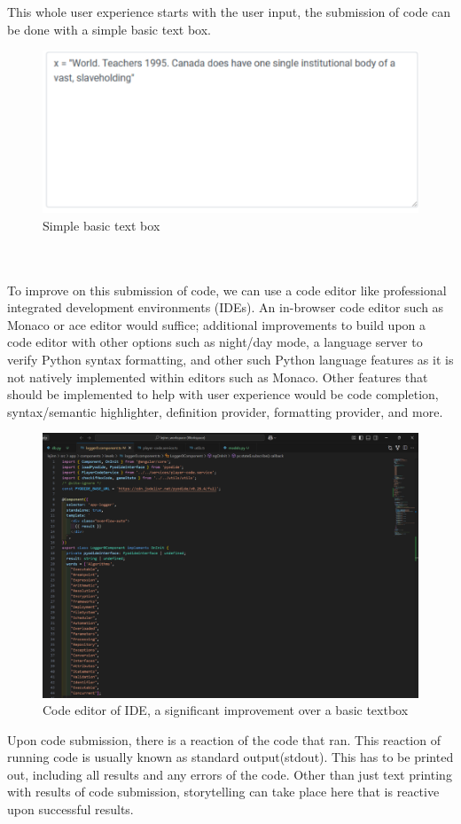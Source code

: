 This whole user experience starts with the user input, the submission of code can be done with a simple basic text box.
\begin{figure}[h]
    \centering
    \includegraphics[width=0.5\linewidth]{images/textbox.png}
    \caption{Simple basic text box}
\end{figure}
\\\\
To improve on this submission of code, we can use a code editor like professional integrated development environments (IDEs). An in-browser code editor such as Monaco or ace editor would suffice; additional improvements to build upon a code editor with other options such as night/day mode, a language server to verify Python syntax formatting, and other such Python language features as it is not natively implemented within editors such as Monaco. Other features that should be implemented to help with user experience would be code completion, syntax/semantic highlighter, definition provider, formatting provider, and more.
\begin{figure}[H]
    \centering
    \includegraphics[width=0.3\linewidth]{images/code_editor.png}
    \caption{Code editor of IDE, a significant improvement over a basic textbox}
\end{figure}
Upon code submission, there is a reaction of the code that ran. This reaction of running code is usually known as standard output(stdout). This has to be printed out, including all results and any errors of the code. Other than just text printing with results of code submission, storytelling can take place here that is reactive upon successful results. 

